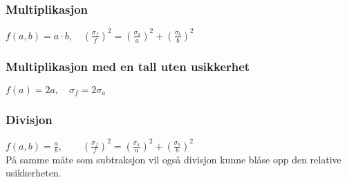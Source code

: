 \subsubsection*{Multiplikasjon}
$f(a,b) = a\cdot b, 
\quad  \left(\frac{\sigma_f}{f}\right)^2 = \left(\frac{\sigma_a}{a}\right)^2 + \left(\frac{\sigma_b}{b}\right)^2$
\subsubsection*{Multiplikasjon med en tall uten usikkerhet}
$f(a) = 2a, \quad \sigma_f = 2\sigma_a$
\subsubsection*{Divisjon}
$f(a,b) = \frac{a}{b}, \quad 
\quad  \left(\frac{\sigma_f}{f}\right)^2 = \left(\frac{\sigma_a}{a}\right)^2 + \left(\frac{\sigma_b}{b}\right)^2$\\
På samme måte som subtraksjon vil også divisjon kunne blåse opp den relative usikkerheten.